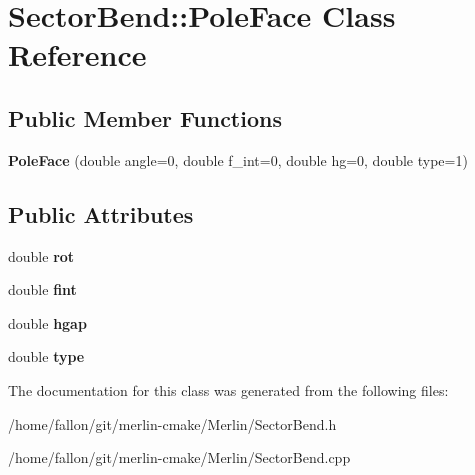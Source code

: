 \hypertarget{classSectorBend_1_1PoleFace}{}\section{Sector\+Bend\+:\+:Pole\+Face Class Reference}
\label{classSectorBend_1_1PoleFace}
\subsection*{Public Member Functions}
\begin{DoxyCompactItemize}
\item 
\mbox{\label{classSectorBend_1_1PoleFace_a17af3e7c9081888316a71f27b0725bbe}} 
{\bfseries Pole\+Face} (double angle=0, double f\+\_\+int=0, double hg=0, double type=1)
\end{DoxyCompactItemize}
\subsection*{Public Attributes}
\begin{DoxyCompactItemize}
\item 
\mbox{\label{classSectorBend_1_1PoleFace_ae3a82f5a4669c18a3d6378e02fbfae5c}} 
double {\bfseries rot}
\item 
\mbox{\label{classSectorBend_1_1PoleFace_ac1f7f1f0d19acd97d4a1f2fe1f76ddd5}} 
double {\bfseries fint}
\item 
\mbox{\label{classSectorBend_1_1PoleFace_aa531e800d8463ab26c1ca691c11568ad}} 
double {\bfseries hgap}
\item 
\mbox{\label{classSectorBend_1_1PoleFace_a633d125848ccde9abbfcf5b04e653de5}} 
double {\bfseries type}
\end{DoxyCompactItemize}


The documentation for this class was generated from the following files\+:\begin{DoxyCompactItemize}
\item 
/home/fallon/git/merlin-\/cmake/\+Merlin/Sector\+Bend.\+h\item 
/home/fallon/git/merlin-\/cmake/\+Merlin/Sector\+Bend.\+cpp\end{DoxyCompactItemize}
